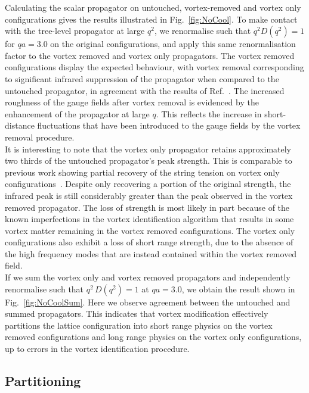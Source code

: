 Calculating the scalar propagator on untouched, vortex-removed and vortex only configurations gives the results illustrated in Fig.~\ref{fig:NoCool}. To make contact with the tree-level propagator at large $q^2$, we renormalise such that $q^2D(q^2)=1$ for $qa = 3.0$ on the original configurations, and apply this same renormalisation factor to the vortex removed and vortex only propagators. The vortex removed configurations display the expected behaviour, with vortex removal corresponding to significant infrared suppression of the propagator when compared to the untouched propagator, in agreement with the results of Ref.~\cite{Bowman:2010zr}. The increased roughness of the gauge fields after vortex removal is evidenced by the enhancement of the propagator at large $q$. This reflects the increase in short-distance fluctuations that have been introduced to the gauge fields by the vortex removal procedure.\\

It is interesting to note that the vortex only propagator retains approximately two thirds of the untouched propagator's peak strength. This is comparable to previous work showing partial recovery of the string tension on vortex only configurations~\cite{Trewartha:2015ida,Trewartha:2017ive,Langfeld:2003ev,Stack:2002sy}. Despite only recovering a portion of the original strength, the infrared peak is still considerably greater than the peak observed in the vortex removed propagator. The loss of strength is most likely in part because of the known imperfections in the vortex identification algorithm that results in some vortex matter remaining in the vortex removed configurations. The vortex only configurations also exhibit a loss of short range strength, due to the absence of the high frequency modes that are instead contained within the vortex removed field.\\

If we sum the vortex only and vortex removed propagators and independently renormalise such that $q^2\,D(q^2)=1$ at $qa=3.0$, we obtain the result shown in Fig.~\ref{fig:NoCoolSum}. Here we observe agreement between the untouched and summed propagators. This indicates that vortex modification effectively partitions the lattice configuration into short range physics on the vortex removed configurations and long range physics on the vortex only configurations, up to errors in the vortex identification procedure.

\subsection{Partitioning}

